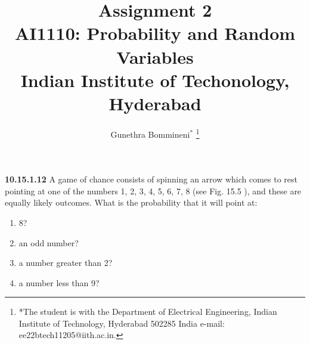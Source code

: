 \documentclass[journal,12pt,twocolumn]{IEEEtran}
\begin{document}
\let\vec\mathbf

\vspace{3cm}

\title{
\textbf {Assignment 2}\\ \large \textbf{AI1110}: Probability and Random Variables\\Indian Institute of Techonology, Hyderabad
}
\author{Gunethra Bommineni$^{*}$%
	\thanks{*The student is with the Department
		of Electrical Engineering, Indian Institute of Technology, Hyderabad
		502285 India e-mail: ee22btech11205@iith.ac.in.}
  }

\maketitle

\newpage


\bigskip
\renewcommand{\thefigure}{\theenumi}
\renewcommand{\thetable}{\theenumi}
\textbf{10.15.1.12}
A game of chance consists of spinning an arrow
which comes to rest pointing at one of the numbers
1, 2, 3, 4, 5, 6, 7, 8 (see Fig. 15.5 ), and these are equally
likely outcomes. What is the probability that it will
point at:
\begin{enumerate}[label=(\roman*)]
\item 
8?
\item 
an odd number?
\item 
a number greater than 2?
\item 
a number less than 9?
\end{enumerate}

\end{document}
